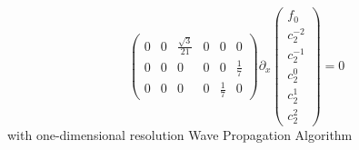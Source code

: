 \begin{frame}
\begin{enumerate}
$$\begin{pmatrix}
		0 & 0 & \frac{\sqrt{3}}{21} & 0 & 0 & 0 \\
		0 & 0 & 0 & 0 & 0 & \frac{1}{7}\\
		0 & 0 & 0 & 0 & \frac{1}{7} & 0
	\end{pmatrix} \partial_x \left(\begin{array}{c}
		f_0 \\
		c_2^{-2} \\
		c_2^{-1} \\
		c_2^0 \\
		c_2^1 \\
		c_2^2
	\end{array}\right) = 0
	$$
	with one-dimensional resolution Wave Propagation Algorithm
	\end{enumerate}
\end{frame}

